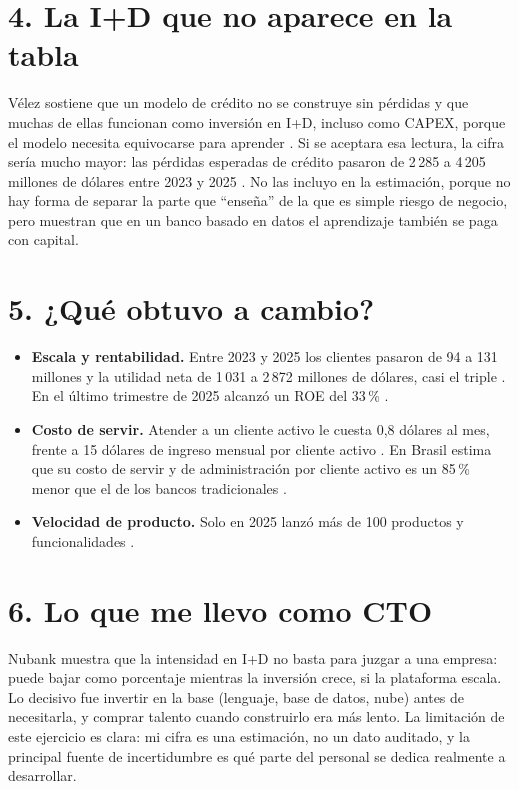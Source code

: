 \documentclass[11pt,letterpaper]{article}
\begin{document}
\section*{4. La I+D que no aparece en la tabla}

Vélez sostiene que un modelo de crédito no se construye sin pérdidas y que
muchas de ellas funcionan como inversión en I+D, incluso como CAPEX, porque
el modelo necesita equivocarse para aprender \parencite{lankenau2023}. Si se
aceptara esa lectura, la cifra sería mucho mayor: las pérdidas esperadas de
crédito pasaron de 2\,285 a 4\,205 millones de dólares entre 2023 y 2025
\parencite{nu2026}. No las incluyo en la estimación, porque no hay forma de
separar la parte que \enquote{enseña} de la que es simple riesgo de negocio,
pero muestran que en un banco basado en datos el aprendizaje también se paga
con capital.

\section*{5. ¿Qué obtuvo a cambio?}

\begin{itemize}[leftmargin=1.2em, itemsep=0.25em]
  \item \textbf{Escala y rentabilidad.} Entre 2023 y 2025 los clientes
    pasaron de 94 a 131 millones y la utilidad neta de 1\,031 a 2\,872
    millones de dólares, casi el triple \parencite{nu2026}. En el último
    trimestre de 2025 alcanzó un ROE del 33\,\% \parencite{nu2026resultados}.
  \item \textbf{Costo de servir.} Atender a un cliente activo le cuesta
    0,8 dólares al mes, frente a 15 dólares de ingreso mensual por cliente
    activo \parencite{nu2026resultados}. En Brasil estima que su costo de
    servir y de administración por cliente activo es un 85\,\% menor que el de
    los bancos tradicionales \parencite{nu2026}.
  \item \textbf{Velocidad de producto.} Solo en 2025 lanzó más de 100
    productos y funcionalidades \parencite{nu2026}.
\end{itemize}

\section*{6. Lo que me llevo como CTO}

Nubank muestra que la intensidad en I+D no basta para juzgar a una empresa:
puede bajar como porcentaje mientras la inversión crece, si la plataforma
escala. Lo decisivo fue invertir en la base (lenguaje, base de datos, nube)
antes de necesitarla, y comprar talento cuando construirlo era más lento. La
limitación de este ejercicio es clara: mi cifra es una estimación, no un dato
auditado, y la principal fuente de incertidumbre es qué parte del personal se
dedica realmente a desarrollar.

\printbibliography[title={Referencias}]
\end{document}
